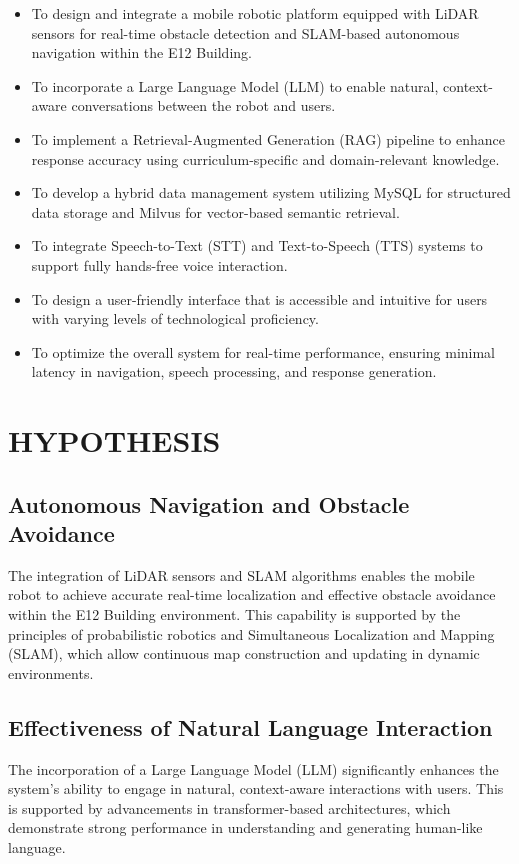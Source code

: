 \begin{itemize}
\item To design and integrate a mobile robotic platform equipped with LiDAR sensors for real-time obstacle detection and SLAM-based autonomous navigation within the E12 Building.
\item To incorporate a Large Language Model (LLM) to enable natural, context-aware conversations between the robot and users.
\item To implement a Retrieval-Augmented Generation (RAG) pipeline to enhance response accuracy using curriculum-specific and domain-relevant knowledge.
\item To develop a hybrid data management system utilizing MySQL for structured data storage and Milvus for vector-based semantic retrieval.
\item To integrate Speech-to-Text (STT) and Text-to-Speech (TTS) systems to support fully hands-free voice interaction.
\item To design a user-friendly interface that is accessible and intuitive for users with varying levels of technological proficiency.
\item To optimize the overall system for real-time performance, ensuring minimal latency in navigation, speech processing, and response generation.
\end{itemize}

\section{HYPOTHESIS}

\subsection{Autonomous Navigation and Obstacle Avoidance}
The integration of LiDAR sensors and SLAM algorithms enables the mobile robot to achieve accurate real-time localization and effective obstacle avoidance within the E12 Building environment. This capability is supported by the principles of probabilistic robotics and Simultaneous Localization and Mapping (SLAM), which allow continuous map construction and updating in dynamic environments.

\subsection{Effectiveness of Natural Language Interaction} 
The incorporation of a Large Language Model (LLM) significantly enhances the system’s ability to engage in natural, context-aware interactions with users. This is supported by advancements in transformer-based architectures, which demonstrate strong performance in understanding and generating human-like language.

